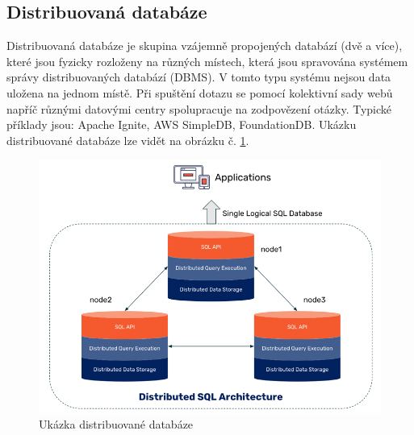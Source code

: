 \subsection{Distribuovaná databáze}
Distribuovaná databáze je skupina vzájemně propojených databází (dvě a více), které jsou fyzicky rozloženy na různých místech, která jsou spravována systémem správy distribuovaných databází (DBMS). V tomto typu systému nejsou data uložena na jednom místě. Při spuštění dotazu se pomocí kolektivní sady webů napříč různými datovými centry spolupracuje na zodpovězení otázky. Typické příklady jsou: Apache Ignite, AWS SimpleDB, FoundationDB. Ukázku distribuované databáze lze vidět na obrázku č. \ref{fig:db_img_distributed}.
	\begin{figure}[H]
	\centering
	\includegraphics[width=13cm]{img/databaze/distributed_db}
	\caption{Ukázka distribuované databáze}
	\label{fig:db_img_distributed}
	\end{figure}
